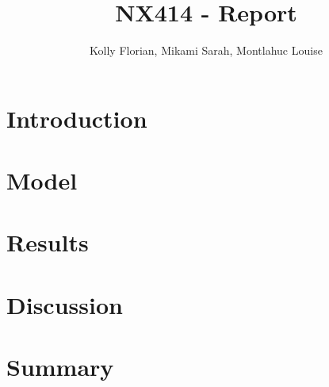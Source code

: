 \documentclass[10pt,conference,compsocconf]{IEEEtran}
\begin{document}
\title{NX414 - Report}

\author{
  Kolly Florian, Mikami Sarah, Montlahuc Louise
}

\maketitle

\begin{abstract}

\end{abstract}

\section{Introduction}

\section{Model}
\label{sec:model}

\section{Results}
\label{sec:results}

\section{Discussion}
\label{sec:discussion}

\section{Summary}



\end{document}
